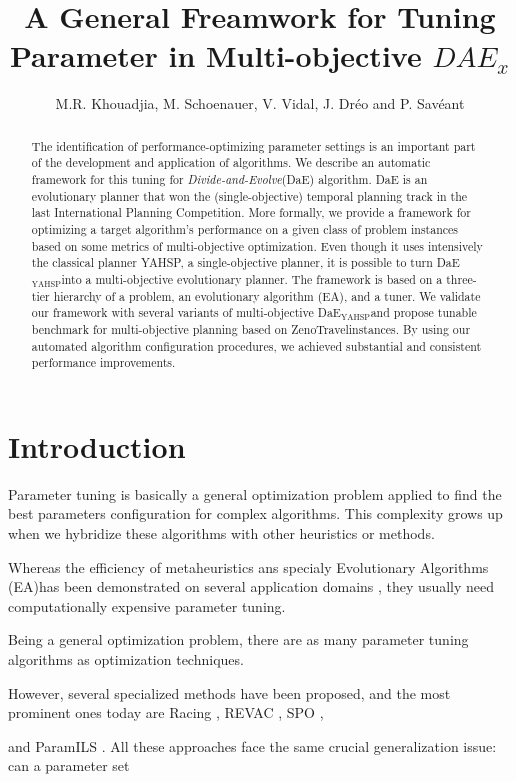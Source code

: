 \documentclass[a4paper,10pt]{article}
\title{A General Freamwork for Tuning Parameter in Multi-objective $DAE_{x}$}
\author{M.R. Khouadjia, M. Schoenauer, V. Vidal, J. Dréo and P. Savéant}
\def\dae{{\em Divide-and-Evolve}}
\def\DAEYAHSP{{\sc DaE$_{\text{YAHSP}}$}}
\def\ZENO{{\sc ZenoTravel}}
\def \EA {{\sc Evolutionary Algorithms (EA)}}
\begin{document}
\maketitle
\begin{abstract}
The identification of performance-optimizing parameter settings is an important part of the development and application of algorithms. 
We describe an automatic framework for this tuning for \dae (DaE) algorithm. DaE is an evolutionary planner that won the (single-objective) temporal planning track in the last International Planning Competition.
More formally, we provide a framework for optimizing a target algorithm’s performance on a given class of problem instances based on some metrics of multi-objective optimization.
Even though it uses intensively the classical planner YAHSP, a single-objective planner, it is possible to turn \DAEYAHSP into a multi-objective evolutionary planner.
The framework is based on a three-tier hierarchy of a problem, an evolutionary algorithm (EA), and a tuner.
 We validate our framework with several variants of multi-objective  \DAEYAHSP and propose tunable benchmark for multi-objective planning based on \ZENO  instances.
 By using our automated algorithm configuration procedures, we achieved substantial and consistent performance improvements.
\end{abstract}




\section{Introduction}
 

Parameter tuning is basically a general optimization problem applied to find the best parameters configuration for complex algorithms. This complexity grows up when we hybridize these algorithms with other heuristics or methods.

Whereas the efficiency of metaheuristics ans specialy \EA has been demonstrated on several application domains \cite{practice08,ParameterSettingBook07}, they usually need computationally expensive parameter tuning. 
 
Being a general optimization problem, there are as many parameter tuning algorithms as optimization techniques.

However, several specialized methods have been proposed, and the most prominent ones today are Racing \cite{birattari2002}, REVAC \cite{Nannen07}, SPO \cite{SPO:CEC05},

and ParamILS \cite{ParamILS-JAIR}. All these approaches face the same crucial generalization issue: can a parameter set 
\end{document}
